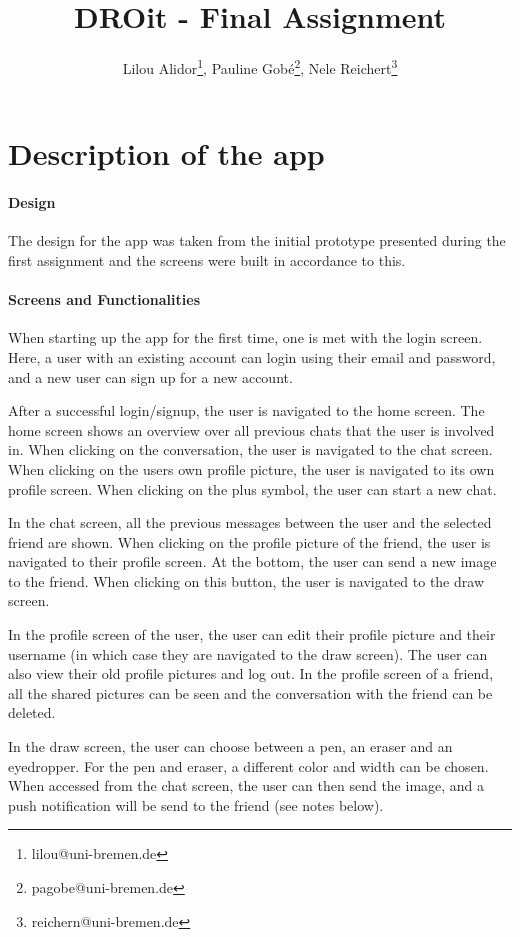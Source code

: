 \documentclass{article}
\title{DROit - Final Assignment}
\author{Lilou Alidor\footnote{lilou@uni-bremen.de}, Pauline Gobé\footnote{pagobe@uni-bremen.de}, Nele Reichert\footnote{reichern@uni-bremen.de} }
\begin{document}
\maketitle

\section{Description of the app}

\paragraph{Design}
The design for the app was taken from the initial prototype presented during the first assignment and the screens were built in accordance to this. 

\paragraph{Screens and Functionalities}
When starting up the app for the first time, one is met with the login screen. Here, a user with an existing account can login using their email and password, and a new user can sign up for a new account. 

After a successful login/signup, the user is navigated to the home screen. The home screen shows an overview over all previous chats that the user is involved in. 
When clicking on the conversation, the user is navigated to the chat screen. When clicking on the users own profile picture, the user is navigated to its own profile screen. When clicking on the plus symbol, the user can start a new chat. 

In the chat screen, all the previous messages between the user and the selected friend are shown. When clicking on the profile picture of the friend, the user is navigated to their profile screen. At the bottom, the user can send a new image to the friend. When clicking on this button, the user is navigated to the draw screen.

In the profile screen of the user, the user can edit their profile picture and their username (in which case they are navigated to the draw screen). The user can also view their old profile pictures and log out.
In the profile screen of a friend, all the shared pictures can be seen and the conversation with the friend can be deleted. 

In the draw screen, the user can choose between a pen, an eraser and an eyedropper. For the pen and eraser, a different color and width can be chosen. When accessed from the chat screen, the user can then send the image, and a push notification will be send to the friend (see notes below).
\end{document}
